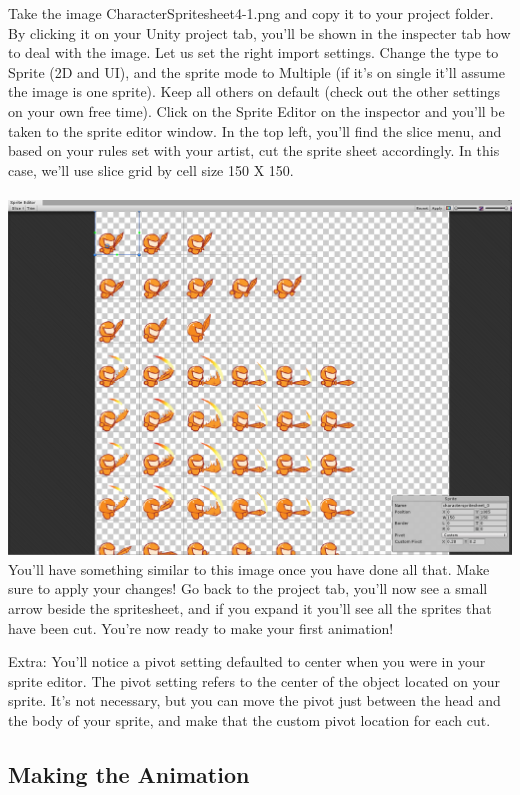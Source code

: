\documentclass[12pt]{article}
\begin{document}
Take the image CharacterSpritesheet4-1.png and copy it to your project folder. By clicking it on your Unity project tab, you'll be shown in the inspecter tab how to deal with the image. Let us set the right import settings. Change the type to Sprite (2D and UI), and the sprite mode to Multiple (if it's on single it'll assume the image is one sprite). Keep all others on default (check out the other settings on your own free time). Click on the Sprite Editor on the inspector and you'll be taken to the sprite editor window. In the top left, you'll find the slice menu, and based on your rules set with your artist, cut the sprite sheet accordingly. In this case, we'll use slice grid by cell size 150 X 150. \\\\
\includegraphics[scale=0.4]{Figure0412} \\

You'll have something similar to this image once you have done all that. Make sure to apply your changes! Go back to the project tab, you'll now see a small arrow beside the spritesheet, and if you expand it you'll see all the sprites that have been cut. You're now ready to make your first animation!

Extra: You'll notice a pivot setting defaulted to center when you were in your sprite editor. The pivot setting refers to the center of the object located on your sprite. It's not necessary, but you can move the pivot just between the head and the body of your sprite, and make that the custom pivot location for each cut.

\subsection{Making the Animation}
\end{document}
